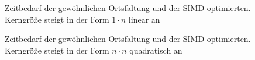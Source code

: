 \documentclass[a4paper,12pt]{article}
\begin{document}
\begin{figure}[htbp]
\caption{Zeitbedarf der gewöhnlichen Ortsfaltung und der SIMD-optimierten.
Kerngröße steigt in der Form $1 \cdot n$ linear an}%
\label{figure_simd_vs_con}
\end{figure}

\begin{figure}[htbp]
\caption{Zeitbedarf der gewöhnlichen Ortsfaltung und der SIMD-optimierten.
Kerngröße steigt in der Form $n \cdot n$ quadratisch an}%
\label{figure_simd_vs_con_quadtrat}
\end{figure}
\end{document}
